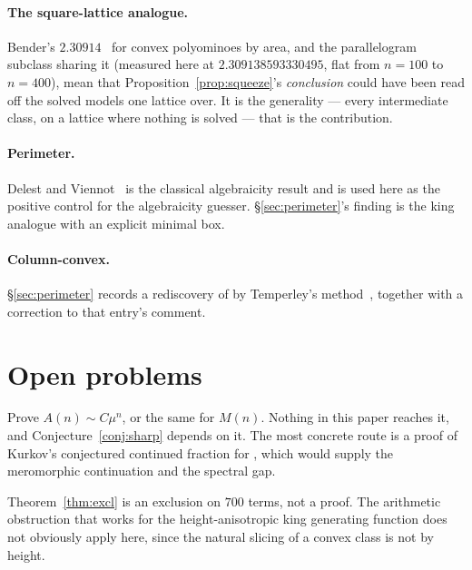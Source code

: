 \documentclass[11pt]{article}
\begin{document}
\paragraph{The square-lattice analogue.} Bender's $2.30914$~\cite{bender1974} for
convex polyominoes by area, and the parallelogram subclass 
sharing it (measured here at $2.309138593330495$, flat from $n = 100$ to
$n = 400$), mean that Proposition~\ref{prop:squeeze}'s \emph{conclusion} could
have been read off the solved models one lattice over. It is the generality ---
every intermediate class, on a lattice where nothing is solved --- that is the
contribution.

\paragraph{Perimeter.} Delest and Viennot~\cite{delestViennot1984} is the
classical algebraicity result and is used here as the positive control for the
algebraicity guesser. \S\ref{sec:perimeter}'s finding is the king analogue with
an explicit minimal box.

\paragraph{Column-convex.} \S\ref{sec:perimeter} records a rediscovery of
 by Temperley's method~\cite{temperley1956}, together with a
correction to that entry's comment.

\section{Open problems}

\begin{openproblem}
Prove $A(n) \sim C\mu^n$, or the same for $M(n)$. Nothing in this paper reaches
it, and Conjecture~\ref{conj:sharp} depends on it. The most concrete route is a
proof of Kurkov's conjectured continued fraction for , which would
supply the meromorphic continuation and the spectral gap.
\end{openproblem}

\begin{openproblem}
Theorem~\ref{thm:excl} is an exclusion on $700$ terms, not a proof. The
arithmetic obstruction that works for the height-anisotropic king generating
function does not obviously apply here, since the natural slicing of a convex
class is not by height.
\end{openproblem}
\end{document}
